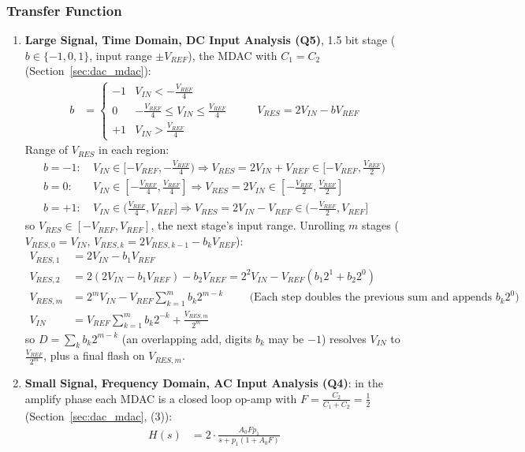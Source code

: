 \subsubsection{Transfer Function}
\begin{enumerate}
  \item \textbf{Large Signal, Time Domain, DC Input Analysis (Q5)}, 1.5 bit stage
(\(b \in \{-1, 0, 1\}\), input range \(\pm V_{REF}\)), the MDAC with \(C_1 = C_2\)
(Section~\ref{sec:dac_mdac}):
\begin{align*}
  b &= \begin{cases} -1 & V_{IN} < -\frac{V_{REF}}{4} \\ 0 & -\frac{V_{REF}}{4} \leq V_{IN} \leq \frac{V_{REF}}{4} \\ +1 & V_{IN} > \frac{V_{REF}}{4} \end{cases} \hspace{1cm}
  V_{RES} = 2 V_{IN} - b V_{REF}
\end{align*}
Range of \(V_{RES}\) in each region:
\begin{align*}
  b = -1:&\ V_{IN} \in [-V_{REF}, -\tfrac{V_{REF}}{4}) \Rightarrow V_{RES} = 2V_{IN} + V_{REF} \in [-V_{REF}, \tfrac{V_{REF}}{2}) \\
  b = 0:&\ V_{IN} \in [-\tfrac{V_{REF}}{4}, \tfrac{V_{REF}}{4}] \Rightarrow V_{RES} = 2V_{IN} \in [-\tfrac{V_{REF}}{2}, \tfrac{V_{REF}}{2}] \\
  b = +1:&\ V_{IN} \in (\tfrac{V_{REF}}{4}, V_{REF}] \Rightarrow V_{RES} = 2V_{IN} - V_{REF} \in (-\tfrac{V_{REF}}{2}, V_{REF}]
\end{align*}
so \(V_{RES} \in [-V_{REF}, V_{REF}]\), the next stage's input range. Unrolling
\(m\) stages (\(V_{RES,0} = V_{IN}\), \(V_{RES,k} = 2V_{RES,k-1} - b_k V_{REF}\)):
\begin{align*}
  V_{RES,1} &= 2V_{IN} - b_1 V_{REF} \\
  V_{RES,2} &= 2(2V_{IN} - b_1 V_{REF}) - b_2 V_{REF} = 2^2 V_{IN} - V_{REF}(b_1 2^1 + b_2 2^0) \\
  V_{RES,m} &= 2^m V_{IN} - V_{REF}\sum_{k=1}^{m} b_k 2^{m-k} \hspace{1cm} \text{(Each step doubles the previous sum and appends } b_k 2^0\text{)} \\
  V_{IN} &= V_{REF}\sum_{k=1}^{m} b_k 2^{-k} + \frac{V_{RES,m}}{2^m}
\end{align*}
so \(D = \sum_k b_k 2^{m-k}\) (an overlapping add, digits \(b_k\) may be \(-1\))
resolves \(V_{IN}\) to \(\frac{V_{REF}}{2^m}\), plus a final flash on \(V_{RES,m}\).
  \item \textbf{Small Signal, Frequency Domain, AC Input Analysis (Q4)}: in the amplify phase each
    MDAC is a closed loop op-amp with \(F = \frac{C_2}{C_1 + C_2} = \frac{1}{2}\) (Section~\ref{sec:dac_mdac}, (3)):
    \begin{align*}
      H(s) &= 2\cdot\frac{A_0 F p_1}{s + p_1(1 + A_0 F)} \tag{1}
    \end{align*}
\end{enumerate}

